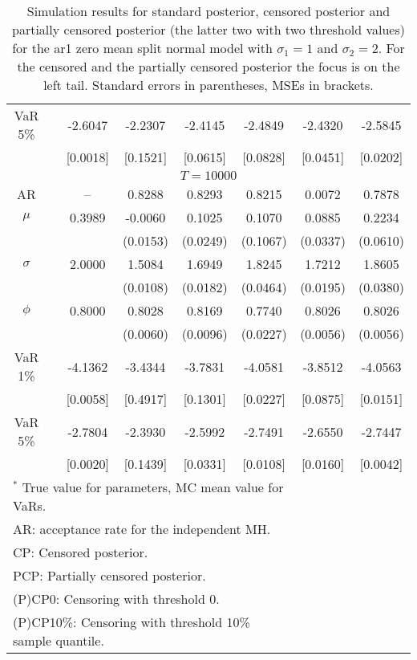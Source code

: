 {\begin{table}
\begin{tabular}{cc cccccc}
VaR 5\% && -2.6047 & -2.2307 & -2.4145 & -2.4849 & -2.4320 & -2.5845 \\ 
 && [0.0018] & [0.1521] & [0.0615] & [0.0828] & [0.0451] & [0.0202] \\ 
\hline 
\multicolumn{8}{c}{$T =10000$}  \\ 
\hline 
AR && -- & 0.8288 & 0.8293 & 0.8215 & 0.0072 & 0.7878 \\  
$\mu$&& 0.3989 & -0.0060 & 0.1025 & 0.1070 & 0.0885 & 0.2234 \\ 
&&   & (0.0153) & (0.0249) & (0.1067) & (0.0337) & (0.0610) \\ 
$\sigma$&& 2.0000 & 1.5084 & 1.6949 & 1.8245 & 1.7212 & 1.8605 \\ 
&&   & (0.0108) & (0.0182) & (0.0464) & (0.0195) & (0.0380) \\ 
$\phi$&& 0.8000 & 0.8028 & 0.8169 & 0.7740 & 0.8026 & 0.8026 \\ 
&&   & (0.0060) & (0.0096) & (0.0227) & (0.0056) & (0.0056) \\ 
VaR 1\% && -4.1362 & -3.4344 & -3.7831 & -4.0581 & -3.8512 & -4.0563 \\ 
  && [0.0058] & [0.4917] & [0.1301] & [0.0227] & [0.0875] & [0.0151] \\ 
VaR 5\% && -2.7804 & -2.3930 & -2.5992 & -2.7491 & -2.6550 & -2.7447 \\ 
 && [0.0020] & [0.1439] & [0.0331] & [0.0108] & [0.0160] & [0.0042] \\ 
\hline 
\multicolumn{6}{l}{\footnotesize{$^*$ True value for parameters, MC mean value for VaRs.}}  \\ 
\multicolumn{6}{l}{\footnotesize{AR: acceptance rate for the independent MH.}}  \\ 
\multicolumn{6}{l}{\footnotesize{CP: Censored posterior.}}  \\ 
\multicolumn{6}{l}{\footnotesize{PCP: Partially censored posterior.}} \\ 
\multicolumn{6}{l}{\footnotesize{(P)CP0: Censoring with threshold 0.}} \\ 
\multicolumn{6}{l}{\footnotesize{(P)CP10\%: Censoring with threshold 10\% sample quantile.}}  \\ 
\end{tabular}
 \caption{Simulation results for standard posterior, censored posterior and partially censored posterior (the latter two with two threshold values) for the ar1 zero mean split normal model with $\sigma_{1} = 1$ and $\sigma_{2} = 2$. For the censored and the partially censored posterior the focus is on the left tail. Standard errors in parentheses, MSEs in brackets.} 
\label{tab:ar1_pcp}  
\end{table}
}